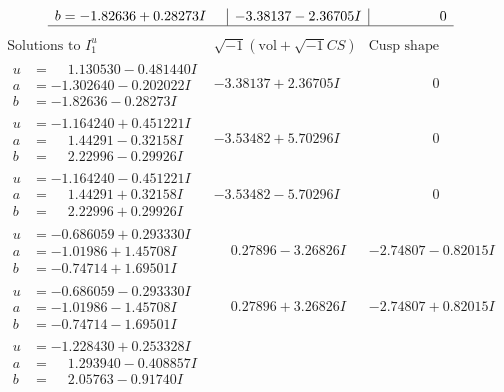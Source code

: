 \documentclass[1p]{elsarticle_modified}
\theoremstyle{definition}
\newcommand{\I}{\sqrt{-1}}
\begin{document}
$$\begin{array}{c|c|c}
\begin{aligned}
b &= -1.82636 + 0.28273 I\end{aligned}
 & -3.38137 - 2.36705 I & \phantom{-0.000000 } 0\\
 \hline 
 \end{array}$$\newpage$$\begin{array}{c|c|c}  
\text{Solutions to }I^u_{1}& \I (\text{vol} + \sqrt{-1}CS) & \text{Cusp shape}\\
 \hline 
\begin{aligned}
u &= \phantom{-}1.130530 - 0.481440 I \\
a &= -1.302640 - 0.202022 I \\
b &= -1.82636 - 0.28273 I\end{aligned}
 & -3.38137 + 2.36705 I & \phantom{-0.000000 } 0 \\ \hline\begin{aligned}
u &= -1.164240 + 0.451221 I \\
a &= \phantom{-}1.44291 - 0.32158 I \\
b &= \phantom{-}2.22996 - 0.29926 I\end{aligned}
 & -3.53482 + 5.70296 I & \phantom{-0.000000 } 0 \\ \hline\begin{aligned}
u &= -1.164240 - 0.451221 I \\
a &= \phantom{-}1.44291 + 0.32158 I \\
b &= \phantom{-}2.22996 + 0.29926 I\end{aligned}
 & -3.53482 - 5.70296 I & \phantom{-0.000000 } 0 \\ \hline\begin{aligned}
u &= -0.686059 + 0.293330 I \\
a &= -1.01986 + 1.45708 I \\
b &= -0.74714 + 1.69501 I\end{aligned}
 & \phantom{-}0.27896 - 3.26826 I & -2.74807 - 0.82015 I \\ \hline\begin{aligned}
u &= -0.686059 - 0.293330 I \\
a &= -1.01986 - 1.45708 I \\
b &= -0.74714 - 1.69501 I\end{aligned}
 & \phantom{-}0.27896 + 3.26826 I & -2.74807 + 0.82015 I \\ \hline\begin{aligned}
u &= -1.228430 + 0.253328 I \\
a &= \phantom{-}1.293940 - 0.408857 I \\
b &= \phantom{-}2.05763 - 0.91740 I\end{aligned}

\end{array}$$
\end{document}
